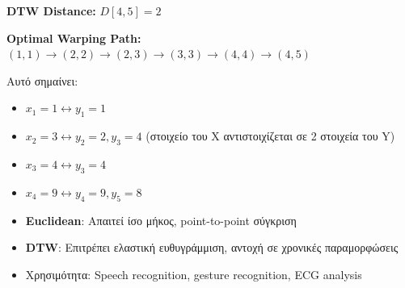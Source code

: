 \textbf{DTW Distance:} $D[4,5] = 2$

\textbf{Optimal Warping Path:}
$(1,1) \to (2,2) \to (2,3) \to (3,3) \to (4,4) \to (4,5)$

Αυτό σημαίνει:
\begin{itemize}
    \item $x_1 = 1 \leftrightarrow y_1 = 1$
    \item $x_2 = 3 \leftrightarrow y_2 = 2, y_3 = 4$ (στοιχείο του X αντιστοιχίζεται σε 2 στοιχεία του Y)
    \item $x_3 = 4 \leftrightarrow y_3 = 4$
    \item $x_4 = 9 \leftrightarrow y_4 = 9, y_5 = 8$
\end{itemize}

\begin{infobox}
\begin{itemize}
    \item \textbf{Euclidean}: Απαιτεί ίσο μήκος, point-to-point σύγκριση
    \item \textbf{DTW}: Επιτρέπει ελαστική ευθυγράμμιση, αντοχή σε χρονικές παραμορφώσεις
    \item Χρησιμότητα: Speech recognition, gesture recognition, ECG analysis
\end{itemize}
\end{infobox}

